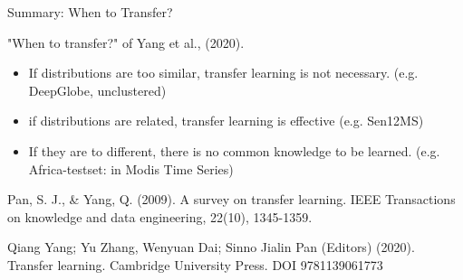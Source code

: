 \documentclass[11pt]{beamer}
\newcommand{\citeapa}[1]{ {\tiny#1\par} }
\begin{document}
	\begin{frame}{Summary: When to Transfer?}
		
	
		\vspace{1em}
		"When to transfer?" of Yang et al., (2020). 
		\vspace{1em}
		\begin{itemize}
			\item<1-> If distributions are too similar, transfer learning is not necessary. (e.g. DeepGlobe, unclustered)
			\item<2-> if distributions are related, transfer learning is effective (e.g. Sen12MS)
			\item<3-> If they are to different, there is no common knowledge to be learned. (e.g. Africa-testset: in Modis Time Series)
		\end{itemize} 
	
		\vfill
		
		\citeapa{Pan, S. J., \& Yang, Q. (2009). A survey on transfer learning. IEEE Transactions on knowledge and data engineering, 22(10), 1345-1359.}
		\citeapa{Qiang Yang; Yu Zhang, Wenyuan Dai; Sinno Jialin Pan (Editors) (2020). Transfer learning. Cambridge University Press. DOI 9781139061773}
	\end{frame}
\end{document}
